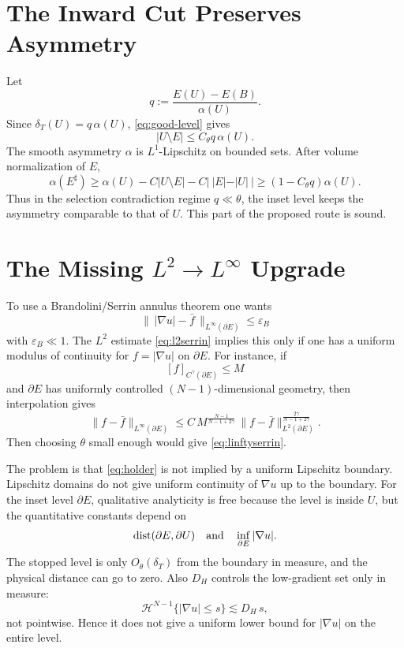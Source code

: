\documentclass[11pt]{article}
\newcommand{\dT}{\delta_T}
\begin{document}
\section{The Inward Cut Preserves Asymmetry}

Let
\[
   q:=\frac{E(U)-E(B)}{\alpha(U)}.
\]
Since \(\dT(U)=q\,\alpha(U)\), \eqref{eq:good-level} gives
\[
   |U\setminus E|\le C_\theta q\,\alpha(U).
\]
The smooth asymmetry \(\alpha\) is \(L^1\)-Lipschitz on bounded sets.  After
volume normalization of \(E\),
\[
   \alpha(E^\sharp)
      \ge
      \alpha(U)-C|U\setminus E|-C|\ |E|-|U|\ |
      \ge
      (1-C_\theta q)\alpha(U).
   \tag{4.1}\label{eq:asym-preserve}
\]
Thus in the selection contradiction regime \(q\ll\theta\), the inset level
keeps the asymmetry comparable to that of \(U\).  This part of the proposed
route is sound.

\section{The Missing \(L^2\to L^\infty\) Upgrade}

To use a Brandolini/Serrin annulus theorem one wants
\[
   \|\,|\nabla u|-\bar f\,\|_{L^\infty(\partial E)}
      \le \varepsilon_B
   \tag{5.1}\label{eq:linftyserrin}
\]
with \(\varepsilon_B\ll1\).  The \(L^2\) estimate
\eqref{eq:l2serrin} implies this only if one has a uniform modulus of
continuity for \(f=|\nabla u|\) on \(\partial E\).  For instance, if
\[
   [f]_{C^\gamma(\partial E)}\le M
   \tag{5.2}\label{eq:holder}
\]
and \(\partial E\) has uniformly controlled \((N-1)\)-dimensional geometry,
then interpolation gives
\[
   \|f-\bar f\|_{L^\infty(\partial E)}
      \le
      C\,M^{\frac{N-1}{N-1+2\gamma}}\,
      \|f-\bar f\|_{L^2(\partial E)}^{\frac{2\gamma}{N-1+2\gamma}}.
   \tag{5.3}\label{eq:interp}
\]
Then choosing \(\theta\) small enough would give \eqref{eq:linftyserrin}.

The problem is that \eqref{eq:holder} is not implied by a uniform Lipschitz
boundary.  Lipschitz domains do not give uniform continuity of \(\nabla u\) up
to the boundary.  For the inset level \(\partial E\), qualitative analyticity
is free because the level is inside \(U\), but the quantitative constants
depend on
\[
   \operatorname{dist}(\partial E,\partial U)
   \quad\hbox{and}\quad
   \inf_{\partial E}|\nabla u|.
\]
The stopped level is only \(O_\theta(\dT)\) from the boundary in measure, and
the physical distance can go to zero.  Also \(D_H\) controls the
low-gradient set only in measure:
\[
   \mathcal H^{N-1}\{|\nabla u|\le s\}
      \lesssim D_H\,s,
\]
not pointwise.  Hence it does not give a uniform lower bound for
\(|\nabla u|\) on the entire level.
\end{document}
